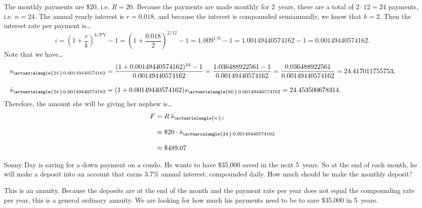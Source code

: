 \documentclass[11pt,letterpaper]{article}
\begin{document}
The monthly payments are \$20, i.e. $R= 20$. Because the payments are made monthly for 2~years, there are a total of $2 \cdot 12= 24$ payments, i.e. $n= 24$. The annual yearly interest is $r= 0.018$, and because the interest is compounded semiannually, we know that $k= 2$. Then the interest rate per payment is\dots 
	\[
	i= \left( 1 + \dfrac{r}{k} \right)^{k/\text{PY}} - 1= \left( 1 + \dfrac{0.018}{2} \right)^{2/12} - 1= 1.009^{1/6} - 1= 1.00149440574162 - 1= 0.00149440574162.
	\] \pspace
Note that we have\dots 
	\[
	\begin{aligned}
	\hspace{-1cm} s_{\actuarialangle{24\,}\, 0.00149440574162}&= \dfrac{(1 + 0.00149440574162)^{24} - 1}{0.00149440574162}= \dfrac{1.036488922561 - 1}{0.00149440574162}= \dfrac{0.036488922561}{0.00149440574162}= 24.417011755753, \\[0.3cm]
	\hspace{-1cm} \ddot{s}_{\actuarialangle{24\,}\, 0.00149440574162}&= (1 + 0.00149440574162) s_{\actuarialangle{60\,}\, 0.00149440574162}= 24.453500678314.
	\end{aligned}
	\] \pspace
Therefore, the amount she will be giving her nephew is\dots
	\[
	\begin{aligned}
	F&= R\, \ddot{s}_{\actuarialangle{n\,}\, i} \\[0.3cm]
	&= \$20 \cdot \ddot{s}_{\actuarialangle{24\,}\, 0.00149440574162} \\[0.3cm]
	&\approx \$489.07
	\end{aligned}
	\]



\newpage



 Sonny Day is saving for a down payment on a condo. He wants to have \$35,000 saved in the next 5~years. So at the end of each month, he will make a deposit into an account that earns 3.7\% annual interest, compounded daily. How much should he make the monthly deposit? \pspace

\sol This is an annuity. Because the deposits are at the end of the month and the payment rate per year does not equal the compounding rate per year, this is a general ordinary annuity. We are looking for how much his payments need to be to save \$35,000 in 5~years. \pspace
\end{document}

